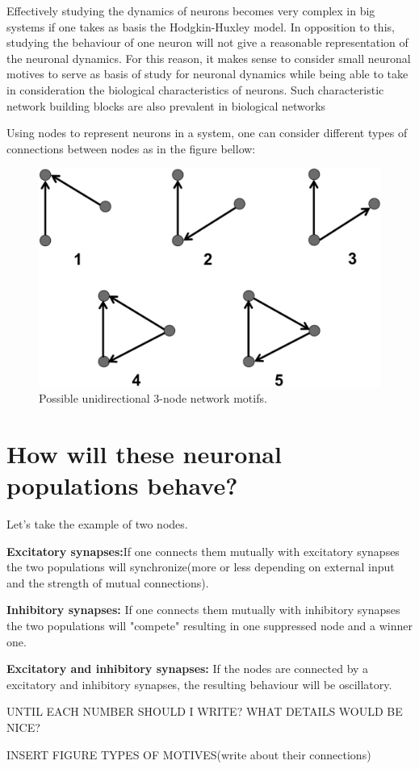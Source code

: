 \documentclass[../../Orator]{subfiles}
\begin{document}
\indent Effectively studying the dynamics of neurons becomes very complex in big systems if one takes as basis the Hodgkin-Huxley model. In opposition to this, studying the behaviour of one neuron will not give a reasonable representation of the neuronal dynamics. For this reason, it makes sense to consider small neuronal motives to serve as basis of study for neuronal dynamics while being able to take in consideration the biological characteristics of neurons. Such characteristic network building blocks are also prevalent in biological networks \cite{Sporns2004}

\indent Using nodes to represent neurons in a system, one can consider different types of connections between nodes as in the figure bellow:


\begin{figure}[h!]
    \centering
    \includegraphics[width=200 pt]{Pictures/Ana/Motif.png}
    \caption{ Possible unidirectional 3-node network motifs. \cite{Shadizadeh2022}}
    \label{fig:enter-label}
\end{figure}

\section{ How will these neuronal populations behave?}

\indent Let's take the example of two nodes. \newline

\textbf{Excitatory synapses:}If one connects them mutually with excitatory synapses the two populations will synchronize(more or less depending on external input and the strength of mutual connections).

\textbf{Inhibitory synapses:} If one connects them mutually with inhibitory synapses the two populations will "compete" resulting in one suppressed node and a winner one.

\textbf{Excitatory and inhibitory synapses:} If the nodes are connected by a excitatory and inhibitory synapses, the resulting behaviour will be oscillatory.

UNTIL EACH NUMBER SHOULD I WRITE? WHAT DETAILS WOULD BE NICE?

INSERT FIGURE
TYPES OF MOTIVES(write about their connections)
\end{document}
